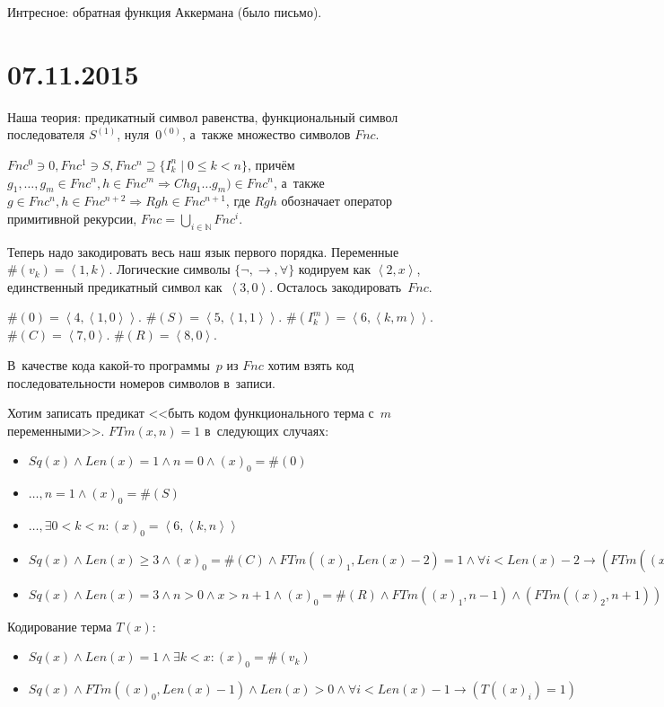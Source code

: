 \documentclass{article}
\theoremstyle{remark}
\renewcommand{\le}{\leqslant}
\renewcommand{\ge}{\geqslant}
\begin{document}
Интресное: обратная функция Аккермана (было письмо).

\section*{07.11.2015}

Наша теория: предикатный символ равенства, функциональный символ последователя
$S^{(1)}$, нуля~$0^{(0)}$, а~также множество символов $Fnc$.

$Fnc^0 \ni 0, Fnc^1 \ni S, Fnc^n \supseteq \{ I^n_k \mid 0 \le k < n \}$, причём
$g_1, \ldots, g_m \in Fnc^n, h \in Fnc^m \Rightarrow Chg_1\ldots g_m) \in
Fnc^n$, а~также $g \in Fnc^n, h \in Fnc^{n+2} \Rightarrow Rgh \in Fnc^{n+1}$,
где $Rgh$ обозначает оператор примитивной рекурсии, $Fnc = \bigcup\limits_{i\in
\mathbb{N}} Fnc^i$.

Теперь надо закодировать весь наш язык первого порядка. Переменные $\#(v_k) =
\left<1, k\right>$. Логические символы $\{\neg, \rightarrow, \forall\}$ кодируем
как $\left<2, x\right>$, единственный предикатный символ как~$\left<3,
0\right>$. Осталось закодировать~$Fnc$.

$\#(0) = \left<4, \left<1, 0\right>\right>$.
$\#(S) = \left<5, \left<1, 1\right>\right>$.
$\#(I^m_k) = \left<6, \left<k, m\right>\right>$.
$\#(C) = \left<7, 0\right>$.
$\#(R) = \left<8, 0\right>$.

В~качестве кода какой-то программы~$p$ из $Fnc$ хотим взять код
последовательности номеров символов в~записи.

Хотим записать предикат <<быть кодом функционального терма с~$m$ переменными>>.
$FTm(x, n) = 1$ в~следующих случаях:
\begin{itemize}
  \item $Sq(x) \land Len(x) = 1 \land n = 0 \land (x)_0 = \#(0)$
  \item $\ldots, n = 1 \land (x)_0 = \#(S)$
  \item $\ldots, \exists 0 < k < n: (x)_0 = \left<6, \left<k, n\right>\right>$
  \item $Sq(x) \land Len(x) \ge 3 \land (x)_0 = \#(C) \land FTm((x)_1, Len(x)
    - 2) = 1 \land \forall i < Len(x) - 2 \rightarrow (FTm((x)_{i+2}, n))$
  \item $Sq(x) \land Len(x) = 3 \land n > 0 \land x > n + 1 \land (x)_0 = \#(R)
    \land FTm((x)_1, n - 1) \land (FTm((x)_2, n + 1))$
\end{itemize}

Кодирование терма $T(x)$:
\begin{itemize}
  \item $Sq(x) \land Len(x) = 1 \land \exists k < x: (x)_0 = \#(v_k)$
  \item $Sq(x) \land FTm((x)_0, Len(x) - 1) \land Len(x) > 0 \land \forall i <
    Len(x) - 1 \rightarrow (T((x)_i) = 1)$
\end{itemize}
\end{document}
